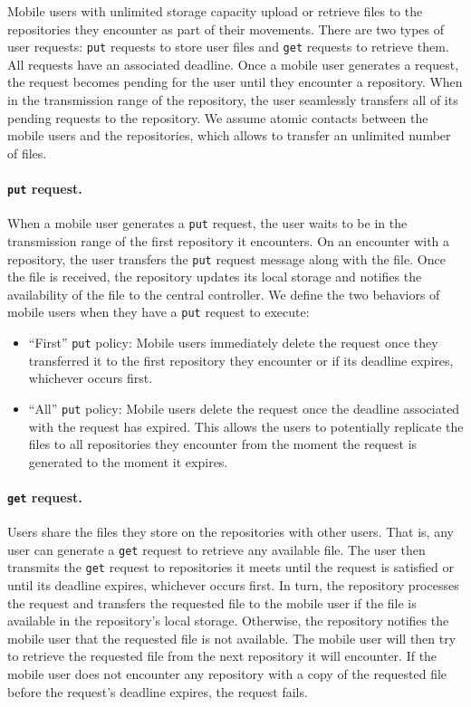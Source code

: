 Mobile users with unlimited storage capacity upload or retrieve files to the repositories they encounter as part of their movements. There are two types of user requests: \texttt{put} requests to store user files and \texttt{get} requests to retrieve them. All requests have an associated deadline. Once a mobile user generates a request, the request becomes pending for the user until they encounter a repository. When in the transmission range of the repository, the user seamlessly transfers all of its pending requests to the repository. We assume atomic contacts between the mobile users and the repositories, which allows to transfer an unlimited number of files.

\paragraph{\texttt{put} request.} 
When a mobile user generates a \texttt{put} request, the user waits to be in the transmission range of the first repository it encounters. On an encounter with a repository, the user transfers the \texttt{put} request message along with the file. Once the file is received, the repository updates its local storage and notifies the availability of the file to the central controller. We define the two behaviors of mobile users when they have a \texttt{put} request to execute:
\begin{itemize}

    \item ``First'' \texttt{put} policy: Mobile users immediately delete the request once they transferred it to the first repository they encounter or if its deadline expires, whichever occurs first.

    \item ``All'' \texttt{put} policy: Mobile users delete the request once the deadline associated with the request has expired. This allows the users to potentially replicate the files to all repositories they encounter from the moment the request is generated to the moment it expires.

\end{itemize}

\paragraph{\texttt{get} request.} 
Users share the files they store on the repositories with other users. That is, any user can generate a \texttt{get} request to retrieve any available file. The user then transmits the \texttt{get} request to repositories it meets until the request is satisfied or until its deadline expires, whichever occurs first. In turn, the repository processes the request and transfers the requested file to the mobile user if the file is available in the repository's local storage. Otherwise, the repository notifies the mobile user that the requested file is not available. The mobile user will then try to retrieve the requested file from the next repository it will encounter. If the mobile user does not encounter any repository with a copy of the requested file before the request's deadline expires, the request fails.

